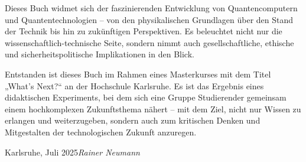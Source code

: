 Dieses Buch widmet sich der faszinierenden Entwicklung von Quantencomputern und Quantentechnologien – von den physikalischen Grundlagen über den Stand der Technik bis hin zu zukünftigen Perspektiven. Es beleuchtet nicht nur die wissenschaftlich-technische Seite, sondern nimmt auch gesellschaftliche, ethische und sicherheitspolitische Implikationen in den Blick.

Entstanden ist dieses Buch im Rahmen eines Masterkurses mit dem Titel „What’s Next?“ an der Hochschule Karlsruhe. Es ist das Ergebnis eines didaktischen Experiments, bei dem sich eine Gruppe Studierender gemeinsam einem hochkomplexen Zukunftsthema nähert – mit dem Ziel, nicht nur Wissen zu erlangen und weiterzugeben, sondern auch zum kritischen Denken und Mitgestalten der technologischen Zukunft anzuregen.


\vspace{\baselineskip}
\begin{flushright}\noindent
Karlsruhe, Juli 2025\hfill {\it Rainer Neumann}\\
\end{flushright}
